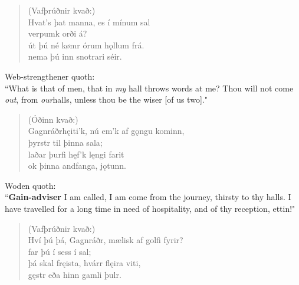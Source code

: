 \begin{verse}
(Vafþrúðnir kvað:) \\%
\bva Hvat's þat manna, \hld es í mínum sal \\%
\ind verpumk orði á? \\%
út þú né kømr \hld órum hǫllum frá. \\%
\ind nema þú inn snotrari séir.\\%
\end{verse}

\bvb Web-strengthener quoth: \\ “What is that of men\footnotemark[10], that in \emph{my} hall throws words at me? Thou will not come \emph{out}, from \emph{our}\footnotemark[11] halls, unless thou be the wiser [of us two]." \\

\begin{verse}
(Óðinn kvað:) \\%
\bva Gagnráðr\footnotemark[5] hęiti'k, \hld nú em'k af gǫngu kominn, \\%
\ind þyrstr til þinna sala; \\%
laðar þurfi \hld hęf'k lęngi farit \\%
\ind ok þinna andfanga, jǫtunn.\\%
\end{verse}

\bvb Woden quoth: \\ “\textbf{Gain-adviser} I am called, I am come from the journey, thirsty to thy halls. I have travelled for a long time in need of hospitality, and of thy reception, ettin!" \\

\begin{verse}
(Vafþrúðnir kvað:) \\%
\bva Hví þú þá, Gagnráðr, \hld mælisk af golfi fyrir? \\%
\ind far þú í sess í sal; \\%
þá skal fręista, \hld hvárr flęira viti, \\%
\ind gęstr eða hinn gamli þulr.\\%
\end{verse}

